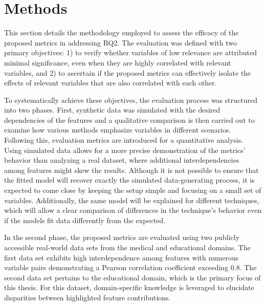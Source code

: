 \section{Methods}
\label{sec: NewMetricsExp}

This section details the methodology employed to assess the efficacy of the proposed metrics in addressing RQ2. The evaluation was defined with two primary objectives: 1) to verify whether variables of low relevance are attributed minimal significance, even when they are highly correlated with relevant variables, and 2) to ascertain if the proposed metrics can effectively isolate the effects of relevant variables that are also correlated with each other.

To systematically achieve these objectives, the evaluation process was structured into two phases. First, synthetic data was simulated with the desired dependencies of the features and a qualitative comparison is then carried out to examine how various methods emphasize variables in different scenarios. Following this, evaluation metrics are introduced for a quantitative analysis. Using simulated data allows for a more precise demonstration of the metrics' behavior than analyzing a real dataset, where additional interdependencies among features might skew the results. Although it is not possible to ensure that the fitted model will recover exactly the simulated data-generating process, it is expected to come close by keeping the setup simple and focusing on a small set of variables. Additionally, the same model will be explained for different techniques, which will allow a clear comparison of differences in the technique's behavior even if the models fit data differently from the expected.

In the second phase, the proposed metrics are evaluated using two publicly accessible real-world data sets from the medical and educational domains. The first data set exhibits high interdependence among features with numerous variable pairs demonstrating a Pearson correlation coefficient exceeding 0.8. The second data set pertains to the educational domain, which is the primary focus of this thesis. For this dataset, domain-specific knowledge is leveraged to elucidate disparities between highlighted feature contributions. 

